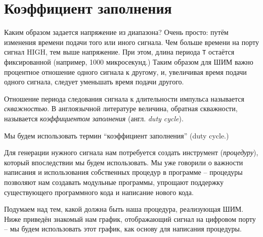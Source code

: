 \documentclass[../sparc.tex]{subfiles}
\begin{document}
\section{Коэффициент заполнения}

Каким образом задается напряжение из диапазона? Очень просто: путём изменения
времени подачи того или иного сигнала. Чем больше времени на порту сигнал HIGH,
тем выше напряжение. При этом, длина периода \texttt{T} остаётся фиксированной
(например, 1000 микросекунд.)  Таким образом для \gls{ШИМ} важно процентное
отношение одного сигнала к другому, и, увеличивая время подачи одного сигнала,
следует уменьшать время подачи другого.


Отношение периода следования сигнала к длительности импульса называется
\emph{скважностью}.  В англоязычной литературе величина, обратная скважности,
называется \emph{коэффициентом заполнения} (англ. \emph{duty cycle}).

Мы будем использовать термин ``коэффициент заполнения'' (duty cycle.)


Для генерации нужного сигнала нам потребуется создать инструмент
(\emph{процедуру}), который впоследствии мы будем использовать.  Мы уже говорили
о важности написания и использования собственных процедур в программе --
процедуры позволяют нам создавать модульные программы, упрощают поддержку
существующего программного кода и написание нового кода.

Подумаем над тем, какой должна быть наша процедура, реализующая ШИМ.  Ниже
приведён знакомый нам график, отображающий сигнал на цифровом порту -- мы будем
использовать этот график, как основу для написания процедуры.

\end{document}
